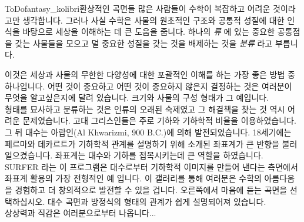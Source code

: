 \begin{surferIntroPage}{ToDo}{fantasy_kolibri}{환상적인 곡면들}
많은 사람들이 수학이 복잡하고 어려운 것이라고만 생각합니다. 그러나 사실 수학은 사물의 원초적인 구조와 공통적 성질에 대한 인식을 바탕으로 세상을 이해하는 데 큰 도움을 줍니다. 하나의 \textit{류} 에 있는 중요한 공통점을 갖는 사물들을 모으고 덜 중요한 성질을 갖는 것을 배제하는 것을 \textit{분류} 라고 부릅니다. 

이것은 세상과 사물의 무한한 다양성에 대한 포괄적인 이해를 하는 가장 좋은 방법 중 하나입니다. 어떤 것이 중요하고 어떤 것이 중요하지 않은지 결정하는 것은 여러분이 무엇을 알고싶은지에 달려 있습니다. 크기와 사물의 구성 형태가 그 예입니다.
\\
\vspace{0.4cm}
형태를 묘사하고 분류하는 것은 인류의 오래된 숙제였고 그 해결책을 찾는 것 역시 어려운 문제였습니다. 고대 그리스인들은 주로 기하와 기하학적 비율을 이용하였습니다. 그 뒤 대수는 아랍인(Al Khwarizmi, 900 B.C.)에 의해 발전되었습니다. 18세기에는 페르마와 데카르트가 기하학적 관계를 설명하기 위해 소개된 좌표계가 큰 반향을 불러일으켰습니다. 좌표계는 대수와 기하를 접목시키는데 큰 역할을 하였습니다.
\\
\vspace{0.4cm}
SURFER 라는 이 프로그램은 대수로부터 기하학적 이미지를 만들어 낸다는 측면에서 좌표계 활용의 가장 전형적인 예 입니다.  이 갤러리를 통해 여러분은 수학의 아름다움을 경험하고 더 창의적으로 발전할 수 있을 겁니다. 오른쪽에서 마음에 듣는 곡면을 선택하십시오. 대수 곡면과 방정식의 형태의 관계가 쉽게 설명되어져 있습니다. \\
상상력과 직감은 여러분으로부터 나옵니다...
\end{surferIntroPage}

